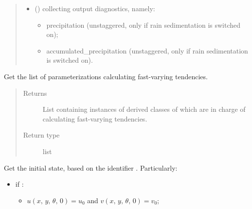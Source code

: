 \documentclass[letterpaper,10pt,english]{sphinxmanual}
\begin{document}
\begin{fulllineitems}
\begin{fulllineitems}
\begin{quote}
\begin{description}
\begin{itemize}
\begin{itemize}
\end{itemize}

\item {} 
 () \textendash{}  collecting output diagnostics, namely:
\begin{itemize}
\item {} 
precipitation (unstaggered, only if rain sedimentation is switched on);

\item {} 
accumulated\_precipitation (unstaggered, only if rain sedimentation is switched on).

\end{itemize}

\end{itemize}


\end{description}\end{quote}

\end{fulllineitems}


\begin{fulllineitems}
\label{\detokenize{api:dycore.dycore_isentropic.DynamicalCoreIsentropic.fast_tendency_parameterizations}}
Get the list of parameterizations calculating fast-varying tendencies.
\begin{quote}\begin{description}
\item[{Returns}] \leavevmode
List containing instances of derived classes of
 which are in charge of
calculating fast-varying tendencies.

\item[{Return type}] \leavevmode
list

\end{description}\end{quote}

\end{fulllineitems}


\begin{fulllineitems}
\label{\detokenize{api:dycore.dycore_isentropic.DynamicalCoreIsentropic.get_initial_state}}
Get the initial state, based on the identifier . Particularly:
\begin{itemize}
\item {} 
if :
\begin{itemize}
\item {} 
\(u(x, \, y, \, \theta, \, 0) = u_0\) and \(v(x, \, y, \, \theta, \, 0) = v_0\);


\end{itemize}
\end{itemize}
\end{fulllineitems}
\end{fulllineitems}
\end{document}
